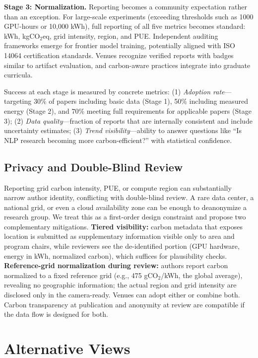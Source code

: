 \documentclass{article}
\theoremstyle{plain}
\theoremstyle{definition}
\theoremstyle{remark}
\begin{document}
\textbf{Stage 3: Normalization.} Reporting becomes a community expectation rather than an exception. For large-scale experiments (exceeding thresholds such as 1000 GPU-hours or 10,000 kWh), full reporting of all five metrics becomes standard: kWh, kgCO$_2$eq, grid intensity, region, and PUE. Independent auditing frameworks emerge for frontier model training, potentially aligned with ISO 14064 certification standards. Venues recognize verified reports with badges similar to artifact evaluation, and carbon-aware practices integrate into graduate curricula.

Success at each stage is measured by concrete metrics: (1) \textit{Adoption rate}---targeting 30\% of papers including basic data (Stage 1), 50\% including measured energy (Stage 2), and 70\% meeting full requirements for applicable papers (Stage 3); (2) \textit{Data quality}---fraction of reports that are internally consistent and include uncertainty estimates; (3) \textit{Trend visibility}---ability to answer questions like ``Is NLP research becoming more carbon-efficient?'' with statistical confidence.

\subsection{Privacy and Double-Blind Review}
\label{sec:privacy-double-blind}

Reporting grid carbon intensity, PUE, or compute region can substantially narrow author identity, conflicting with double-blind review. A rare data center, a national grid, or even a cloud availability zone can be enough to deanonymize a research group. We treat this as a first-order design constraint and propose two complementary mitigations. \textbf{Tiered visibility:} carbon metadata that exposes location is submitted as supplementary information visible only to area and program chairs, while reviewers see the de-identified portion (GPU hardware, energy in kWh, normalized carbon), which suffices for plausibility checks. \textbf{Reference-grid normalization during review:} authors report carbon normalized to a fixed reference grid (e.g., 475 gCO$_2$/kWh, the global average), revealing no geographic information; the actual region and grid intensity are disclosed only in the camera-ready. Venues can adopt either or combine both. Carbon transparency at publication and anonymity at review are compatible if the data flow is designed for both.

\section{Alternative Views}
\end{document}
